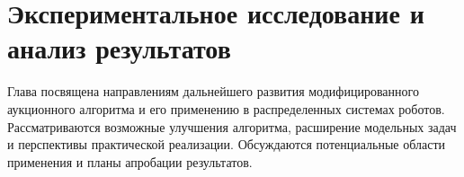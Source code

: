\chapter{Экспериментальное исследование и анализ результатов} \label{ch5}

Глава посвящена направлениям дальнейшего развития модифицированного аукционного алгоритма и его применению в распределенных системах роботов. Рассматриваются возможные улучшения алгоритма, расширение модельных задач  и перспективы практической реализации. Обсуждаются потенциальные области применения и планы апробации результатов.